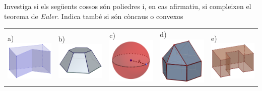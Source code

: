 \begin{mylist}
\exer \mental Investiga si els següents cossos són poliedres i, en cas afirmatiu, si compleixen el teorema de \textit{Euler}. Indica també si són còncaus o convexos


\begin{longtable}{p{0.9in}p{0.9in}p{0.9in}p{1.0in}p{0.8in}} 
a) \includegraphics[width=1in]{img-11/prisma1} & 
b) \includegraphics[width=1in]{img-11/tronc11} & 
c) \includegraphics[width=1in]{img-11/esfera} & 
d) \includegraphics[width=1in]{img-11/raro} & e) 
\includegraphics[width=1in]{img-11/prisma2} \\ 


\end{longtable}
\end{mylist}
